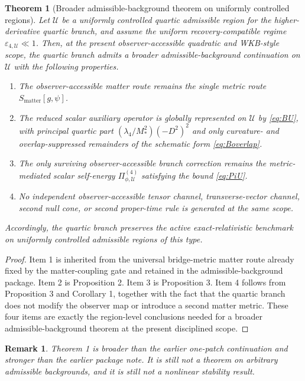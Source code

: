 \documentclass[11pt]{article}
\newtheorem{remark}{Remark}
\newtheorem{theorem}{Theorem}
\begin{document}
\begin{theorem}[Broader admissible-background theorem on uniformly controlled regions]
Let \(\mathcal U\) be a uniformly controlled quartic admissible region for the higher-derivative quartic branch, and assume the uniform recovery-compatible regime \(\varepsilon_{4,\mathcal U}\ll 1\). Then, at the present observer-accessible quadratic and WKB-style scope, the quartic branch admits a broader admissible-background continuation on \(\mathcal U\) with the following properties.
\begin{enumerate}
    \item The observer-accessible matter route remains the single metric route \(S_{\mathrm{matter}}[g,\psi]\).
    \item The reduced scalar auxiliary operator is globally represented on \(\mathcal U\) by \eqref{eq:BU}, with principal quartic part \((\lambda_4/M_*^2)(-D^2)^2\) and only curvature- and overlap-suppressed remainders of the schematic form \eqref{eq:Boverlap}.
    \item The only surviving observer-accessible branch correction remains the metric-mediated scalar self-energy \(\Pi_{\phi,\mathcal U}^{(4)}\) satisfying the bound \eqref{eq:PiU}.
    \item No independent observer-accessible tensor channel, transverse-vector channel, second null cone, or second proper-time rule is generated at the same scope.
\end{enumerate}
Accordingly, the quartic branch preserves the active exact-relativistic benchmark on uniformly controlled admissible regions of this type.
\end{theorem}

\begin{proof}
Item 1 is inherited from the universal bridge-metric matter route already fixed by the matter-coupling gate and retained in the admissible-background package. Item 2 is Proposition 2. Item 3 is Proposition 3. Item 4 follows from Proposition 3 and Corollary 1, together with the fact that the quartic branch does not modify the observer map or introduce a second matter metric. These four items are exactly the region-level conclusions needed for a broader admissible-background theorem at the present disciplined scope.
\end{proof}

\begin{remark}
Theorem 1 is broader than the earlier one-patch continuation and stronger than the earlier package note. It is still not a theorem on arbitrary admissible backgrounds, and it is still not a nonlinear stability result.
\end{remark}
\end{document}
